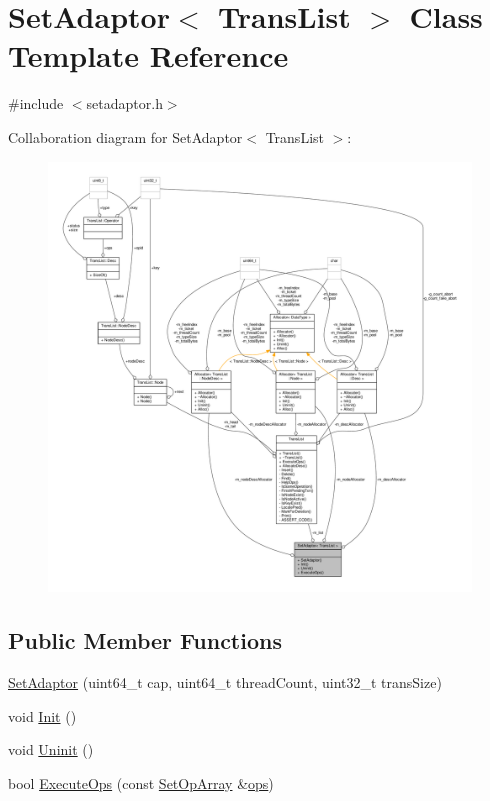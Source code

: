 \hypertarget{classSetAdaptor_3_01TransList_01_4}{\section{Set\-Adaptor$<$ Trans\-List $>$ Class Template Reference}
\label{classSetAdaptor_3_01TransList_01_4}
}


{\ttfamily \#include $<$setadaptor.\-h$>$}



Collaboration diagram for Set\-Adaptor$<$ Trans\-List $>$\-:
\nopagebreak
\begin{figure}[H]
\begin{center}
\leavevmode
\includegraphics[width=350pt]{classSetAdaptor_3_01TransList_01_4__coll__graph}
\end{center}
\end{figure}
\subsection*{Public Member Functions}
\begin{DoxyCompactItemize}
\item 
\hyperlink{classSetAdaptor_3_01TransList_01_4_a97330b3bae205032d2acf27aa9f1acc5}{Set\-Adaptor} (uint64\-\_\-t cap, uint64\-\_\-t thread\-Count, uint32\-\_\-t trans\-Size)
\item 
void \hyperlink{classSetAdaptor_3_01TransList_01_4_aebb2f39c39d4626ad846dd0a6d2de1e7}{Init} ()
\item 
void \hyperlink{classSetAdaptor_3_01TransList_01_4_a86c8a30a762338ea26c7cfd63304e562}{Uninit} ()
\item 
bool \hyperlink{classSetAdaptor_3_01TransList_01_4_a8693f263b5371906471698230084fd02}{Execute\-Ops} (const \hyperlink{setadaptor_8h_a7af6ba4d94b446744e0e49accfb08e24}{Set\-Op\-Array} \&\hyperlink{stmskip_8cc_a91ee67dbc899b78fabcd2bfc4643d307}{ops})
\end{DoxyCompactItemize}
